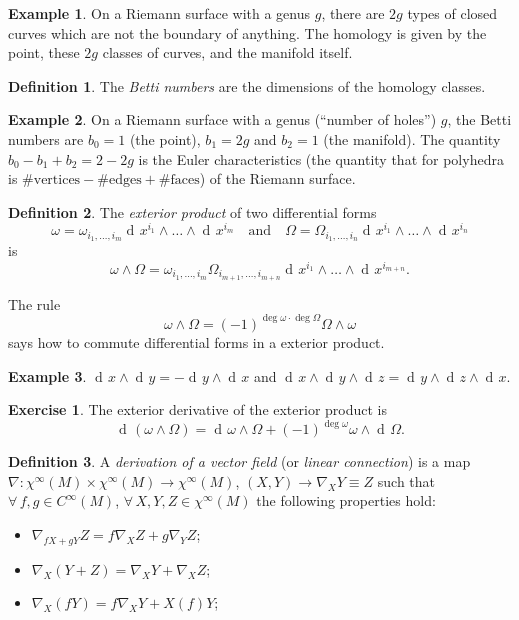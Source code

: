 \documentclass[a4paper,12pt]{book}
\newcommand{\dd}{\mathop{\mathrm{d}\!}{}}
\theoremstyle{definition}
\newtheorem{definition}{Definition}
\newtheorem{example}{Example}
\newtheorem{exercise}{Exercise}
\theoremstyle{remark}
\let\oldcdot\cdot
\renewcommand{\cdot}{\! \oldcdot \!}
\begin{document}
\begin{example}
On a Riemann surface with a genus $g$, there are $2g$ types of closed curves which are not the boundary of anything. The homology is given by the point, these $2g$ classes of curves, and the manifold itself.
\end{example}

\begin{definition}
The \emph{Betti numbers} are the dimensions of the homology classes.
\end{definition}

\begin{example}
On a Riemann surface with a genus (``number of holes'') $g$, the Betti numbers are $b_0=1$ (the point), $b_1=2g$ and $b_2=1$ (the manifold). The quantity $b_0-b_1+b_2=2-2g$ is the Euler characteristics (the quantity that for polyhedra is $\text{\#vertices}-\text{\#edges}+\text{\#faces}$) of the Riemann surface.
\end{example}

\begin{definition}
The \emph{exterior product} of two differential forms
\[\omega=\omega_{i_1,\ldots,i_m}\dd x^{i_1}\wedge\ldots\wedge\dd x^{i_m}\quad\text{and}\quad\Omega=\Omega_{i_1,\ldots,i_n}\dd x^{i_1}\wedge\ldots\wedge\dd x^{i_n}\]
is
\[\omega\wedge\Omega=\omega_{i_1,\ldots,i_m}\Omega_{i_{m+1},\ldots,i_{m+n}}\dd x^{i_1}\wedge\ldots\wedge\dd x^{i_{m+n}}.\]
\end{definition}

The rule
\[\omega\wedge\Omega=(-1)^{\deg\omega\cdot\deg\Omega}\Omega\wedge\omega\]
says how to commute differential forms in a exterior product.

\begin{example}
$\dd x\wedge\dd y=-\dd y\wedge\dd x$ and $\dd x\wedge\dd y\wedge\dd z=\dd y\wedge\dd z\wedge\dd x$.
\end{example}

\begin{exercise}
The exterior derivative of the exterior product is
\[\dd(\omega\wedge\Omega)=\dd\omega\wedge\Omega+(-1)^{\deg\omega}\omega\wedge\dd\Omega.\]
\end{exercise}

\begin{definition}
A \emph{derivation of a vector field} (or \emph{linear connection}) is a map $\nabla\colon \chi^\infty(M)\times\chi^\infty(M)\to\chi^\infty(M)$, $(X,Y)\to\nabla_XY\equiv Z$ such that $\forall\, f,g\in C^\infty(M)$, $\forall\,X,Y,Z\in\chi^\infty(M)$ the following properties hold:
\begin{itemize}
\item $\nabla_{fX+gY}Z=f\nabla_XZ+g\nabla_YZ$;
\item $\nabla_X(Y+Z)=\nabla_XY+\nabla_XZ$;
\item $\nabla_X(fY)=f\nabla_XY+X(f)Y$;
\end{itemize}
\end{definition}
\end{document}
